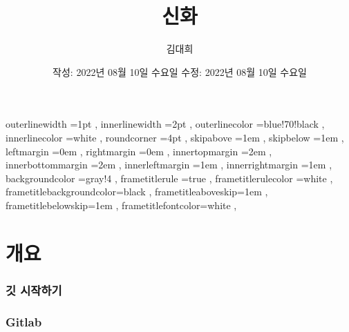 \documentclass[12pt, a4paper, oneside]{book}
\let\stdsection\section
\renewcommand\section{\newpage\stdsection}
\begin{document}
	
			\dominitoc
			\doparttoc			


			\title{신화}
			\author{김대희}
			\date{ 	작성: 2022년 08월 10일 수요일
					수정: 2022년 08월 10일 수요일 }
			\maketitle


			\tableofcontents 		%
			\listoffigures 			%
			\cleardoublepage
			\listoftables 			%





		 {
						outerlinewidth		=1pt			,%
						innerlinewidth		=2pt			,%
						outerlinecolor		=blue!70!black	,%
						innerlinecolor		=white 			,%
						roundcorner			=4pt			,%
						skipabove			=1em 			,%
						skipbelow			=1em 			,%
						leftmargin			=0em			,%
						rightmargin			=0em			,%
						innertopmargin		=2em 			,%
						innerbottommargin 	=2em 			,%
						innerleftmargin		=1em 			,%
						innerrightmargin		=1em 			,%
						backgroundcolor		=gray!4			,%
						frametitlerule		=true 			,%
						frametitlerulecolor	=white			,%
						frametitlebackgroundcolor=black		,%
						frametitleaboveskip=1em 			,%
						frametitlebelowskip=1em 			,%
						frametitlefontcolor=white 			,%
						}


%


	\part{ 개요  }
	\noptcrule
	\parttoc				

%										
	\section{ 깃 시작하기 }


%										
	\section{ Gitlab }
\end{document}
